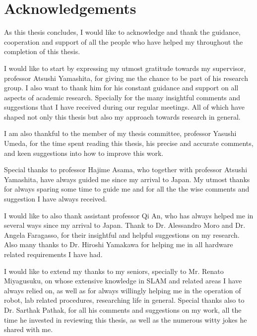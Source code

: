 \chapter*{Acknowledgements}
\lhead[Acknowledgements]{}

\thispagestyle{empty}

\newpage
As this thesis concludes, I would like to acknowledge and thank the guidance, cooperation and support of all the people who have helped my throughout the completion of this thesis.

I would like to start by expressing my utmost gratitude towards my supervisor, professor Atsushi Yamashita, for giving me the chance to be part of his research group. I also want to thank him for his constant guidance and support on all aspects of academic research. Specially for the many insightful comments and suggestions that I have received during our regular meetings. All of which have shaped not only this thesis but also my approach towards research in general. 

I am also thankful to the member of my thesis committee, professor Yasushi Umeda, for the time spent reading this thesis, his precise and accurate comments, and keen suggestions into how to improve this work.

Special thanks to professor Hajime Asama, who together with professor Atsushi Yamashita, have always guided me since my arrival to Japan. My utmost thanks for always sparing some time to guide me and for all the the wise comments and suggestion I have always received. 

I would like to also thank assistant professor Qi An, who has always helped me in several ways since my arrival to Japan. Thank to Dr. Alessandro Moro and Dr. Angela Faragasso, for their insightful and helpful suggestions on my research. Also many thanks to Dr. Hiroshi Yamakawa for helping me in all hardware related requirements I have had.

I would like to extend my thanks to my seniors, specially to Mr. Renato Miyagusuku, on whose extensive knowledge in SLAM and related areas I have always relied on, as well as for always willingly helping me in the operation of robot, lab related procedures, researching life in general. Special thanks also to Dr. Sarthak Pathak, for all his comments and suggestions on my work, all the time he invested in reviewing this thesis, as well as the numerous witty jokes he shared with me. 

